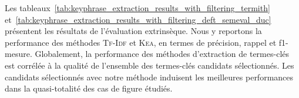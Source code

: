         Les
        tableaux~\ref{tab:keyphrase_extraction_results_with_filtering_termith}
        et~\ref{tab:keyphrase_extraction_results_with_filtering_deft_semeval_duc}
        présentent les résultats de l'évaluation extrinsèque. Nous y reportons
        la performance des méthodes \textsc{Tf-Idf} et \textsc{Kea}, en termes
        de précision, rappel et f1-mesure.
        Globalement, la performance des méthodes d'extraction de termes-clés est
        corrélée à la qualité de l'ensemble des termes-clés candidats
        sélectionnés. Les candidats sélectionnés avec notre méthode induisent
        les meilleures performances dans la quasi-totalité des cas de figure
        étudiés.
